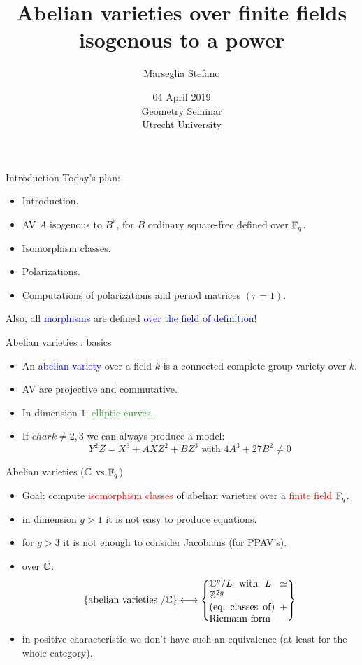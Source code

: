 \documentclass[usenames,dvipsnames]{beamer}
\title[]{Abelian varieties over finite fields isogenous to a power}
\author[Marseglia Stefano]{Marseglia Stefano}
\institute[]{Utrecht University}
\date[04 April 2019]{04 April 2019\\
	   Geometry Seminar\\ Utrecht University}
\newcommand{\red}[1]{\textcolor{red}{#1}}
\newcommand{\blue}[1]{\textcolor{blue}{#1}}
\newcommand{\green}[1]{\textcolor{ForestGreen}{#1}}
\renewcommand{\char}{char}
\begin{document}
\begin{frame}
\titlepage
\end{frame}

\begin{frame}{ Introduction }
Today's plan:
\begin{itemize}
 \item Introduction.
 \item AV $A$ isogenous to $B^r$, for $B$ ordinary square-free defined over $\mathbb{F}_q$.
 \item Isomorphism classes.
 \item Polarizations.
 \item Computations of polarizations and period matrices $(r=1)$.
\end{itemize}
Also, all \blue{morphisms} are defined \blue{over the field of definition!}
\end{frame}

\begin{frame}{ Abelian varieties : basics }
\begin{itemize}
 \item An \blue{abelian variety} over a field $k$ is a connected complete group variety over $k$.
 \pause \item AV are projective and commutative.
 \pause \item In dimension $1$: \green{elliptic curves}.
 \pause \item If $\char k \neq 2,3$ we can always produce a model:
 \[ Y^2Z = X^3 + AXZ^2 +BZ^3 \text{ with } 4A^3+27B^2 \neq 0 \]
 \end{itemize}
\end{frame}

\begin{frame}{ Abelian varieties ($\mathbb{C}$ vs $ \mathbb{F}_q $) }
\begin{itemize}
 \item Goal: compute \red{isomorphism classes} of abelian varieties over a \red{finite field} $\mathbb{F}_q$.
 \pause \item in dimension $g>1$ it is not easy to produce equations.
 \pause \item for $g>3$ it is not enough to consider Jacobians (for PPAV's).
 \pause \item over $\mathbb{C}$:
 \[
      \set{\text{abelian varieties $/\C$} } \longleftrightarrow 
      \set{\parbox[c]{8em}{$\C^g/L$ with $L\simeq \Z^{2g}$\\ (eq.~classes of) $+$ Riemann form}}
 \]
 \pause \vspace{-6mm} \item in positive characteristic we don't have such an equivalence (at least for the whole category).
\end{itemize}
\end{frame}
\end{document}
